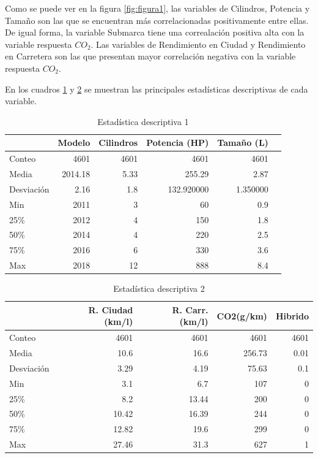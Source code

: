 \documentclass{article}
\begin{document}
Como se puede ver en la figura \ref{fig:figura1}, las variables de Cilindros, Potencia y Tamaño son las que se encuentran más correlacionadas positivamente entre ellas. De igual forma, la variable Submarca tiene una correalación positiva alta con la variable respuesta $CO_2$. Las variables de Rendimiento en Ciudad y Rendimiento en Carretera son las que presentan mayor correlación negativa con la variable respuesta $CO_2$.

En los cuadros \ref{table:tabla1} y \ref{table:tabla2} se muestran las principales estadísticas descriptivas de cada variable.

\begin{table}[ht]
    \begin{adjustbox}{max width=1\textwidth}
        \begin{tabular}{lrrrrr}
        \toprule
         & Modelo & Cilindros & Potencia (HP) & Tamaño (L)\\
        \midrule
        Conteo & 4601 & 4601 & 4601 & 4601\\
        Media & 2014.18 & 5.33 & 255.29 & 2.87\\
        Desviación & 2.16 & 1.8 & 132.920000 & 1.350000\\
        Min & 2011 & 3 & 60 & 0.9\\
        25\% & 2012 & 4 & 150 & 1.8\\
        50\% & 2014 & 4 & 220 & 2.5\\
        75\% & 2016 & 6 & 330 & 3.6\\
        Max & 2018 & 12 & 888 & 8.4\\
        \bottomrule
        \end{tabular}
    \end{adjustbox}
    \centering
    \caption{Estadística descriptiva 1}
    \label{table:tabla1}
\end{table}

\begin{table}[ht]
    \begin{adjustbox}{max width=1\textwidth}
        \begin{tabular}{lrrrr}
        \toprule
         & R. Ciudad (km/l) & R. Carr. (km/l) & CO2(g/km) & Hibrido \\
        \midrule
        Conteo & 4601 & 4601 & 4601 & 4601 \\
        Media & 10.6 & 16.6 & 256.73 & 0.01 \\
        Desviación & 3.29 & 4.19 & 75.63 & 0.1 \\
        Min & 3.1 & 6.7 & 107 & 0 \\
        25\% & 8.2 & 13.44 & 200 & 0 \\
        50\% & 10.42 & 16.39 & 244 & 0 \\
        75\% & 12.82 & 19.6 & 299 & 0 \\
        Max & 27.46 & 31.3 & 627 & 1 \\
        \bottomrule
        \end{tabular}
    \end{adjustbox}
    \centering
    \caption{Estadística descriptiva 2}
    \label{table:tabla2}
\end{table}
\end{document}
